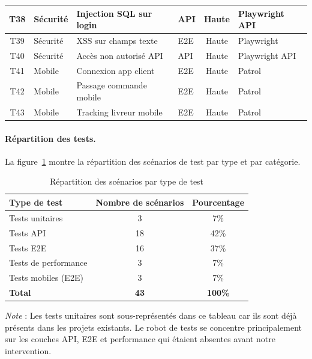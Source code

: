\begin{longtable}{|c|l|p{4.5cm}|l|c|l|}
T38 & Sécurité & Injection SQL sur login & API & Haute & Playwright API \\
\hline
T39 & Sécurité & XSS sur champs texte & E2E & Haute & Playwright \\
\hline
T40 & Sécurité & Accès non autorisé API & API & Haute & Playwright API \\
\hline

T41 & Mobile & Connexion app client & E2E & Haute & Patrol \\
\hline
T42 & Mobile & Passage commande mobile & E2E & Haute & Patrol \\
\hline
T43 & Mobile & Tracking livreur mobile & E2E & Haute & Patrol \\
\hline

\end{longtable}

\paragraph{Répartition des tests.}
La figure~\ref{fig:repartition-tests} montre la répartition des scénarios de test par type et par catégorie.

\begin{table}[H]
\centering
\caption{Répartition des scénarios par type de test}
\label{fig:repartition-tests}
\renewcommand{\arraystretch}{1.2}
\begin{tabular}{|l|c|c|}
\hline
\rowcolor{speedlineBlue!15}
\textbf{Type de test} & \textbf{Nombre de scénarios} & \textbf{Pourcentage} \\
\hline
Tests unitaires & 3 & 7\% \\
\hline
Tests API & 18 & 42\% \\
\hline
Tests E2E & 16 & 37\% \\
\hline
Tests de performance & 3 & 7\% \\
\hline
Tests mobiles (E2E) & 3 & 7\% \\
\hline
\textbf{Total} & \textbf{43} & \textbf{100\%} \\
\hline
\end{tabular}
\end{table}

\textit{Note} : Les tests unitaires sont sous-représentés dans ce tableau car ils sont déjà présents dans les projets existants. Le robot de tests se concentre principalement sur les couches API, E2E et performance qui étaient absentes avant notre intervention.

